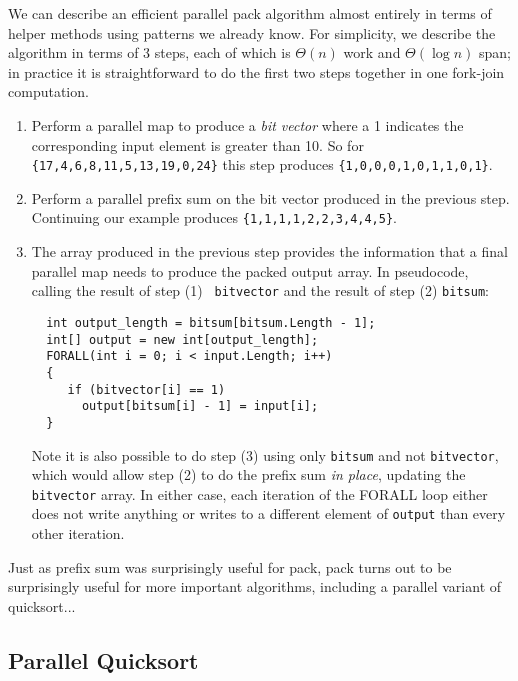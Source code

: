 \documentclass[10pt]{article}
\begin{document}
We can describe an efficient parallel pack algorithm almost entirely
in terms of helper methods using patterns we already know.  For
simplicity, we describe the algorithm in terms of 3 steps, each of
which is $\Theta(n)$ work and $\Theta(\log n)$ span; in practice it is
straightforward to do the first two steps together in one fork-join
computation.
\begin{enumerate}
\item Perform a parallel map to produce a \emph{bit vector} where a 1
  indicates the corresponding input element is greater than 10.  So
  for {\tt \{17,4,6,8,11,5,13,19,0,24\}} this step produces
  {\tt \{1,0,0,0,1,0,1,1,0,1\}}.
\item Perform a parallel prefix sum on the bit vector produced in the
  previous step.  Continuing our example produces
  {\tt \{1,1,1,1,2,2,3,4,4,5\}}.
\item The array produced in the previous step provides the information
  that a final parallel map needs to produce the packed output
  array.  In pseudocode, calling the result of step (1) {\tt
  bitvector} and the result of step (2) {\tt bitsum}:
\begin{verbatim}
  int output_length = bitsum[bitsum.Length - 1];
  int[] output = new int[output_length];
  FORALL(int i = 0; i < input.Length; i++)
  {
     if (bitvector[i] == 1)
       output[bitsum[i] - 1] = input[i];
  }
\end{verbatim}
Note it is also possible to do step (3) using only {\tt bitsum} and
not {\tt bitvector}, which would allow step (2) to do the prefix sum
\emph{in place}, updating the {\tt bitvector} array.  In either case,
each iteration of the FORALL loop either does not write anything or
writes to a different element of {\tt output} than every other
iteration.
\end{enumerate}

Just as prefix sum was surprisingly useful for pack, pack turns out to
be surprisingly useful for more important algorithms, including a
parallel variant of quicksort...

\subsection{Parallel Quicksort}
\end{document}
